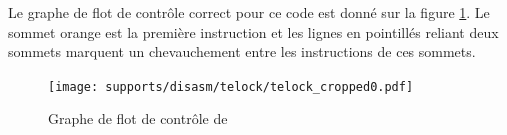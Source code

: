 Le graphe de flot de contrôle correct pour ce code est donné sur la figure \ref{fig:telock_cfg}. Le sommet orange est la première instruction et les lignes en pointillés reliant deux sommets marquent un chevauchement entre les instructions de ces sommets.

\begin{figure}[h]
\begin{center}
\texttt{[image: supports/disasm/telock/telock\_cropped0.pdf]}
\end{center}
\caption{Graphe de flot de contrôle de \telock}
\label{fig:telock_cfg}
\end{figure}

% 

